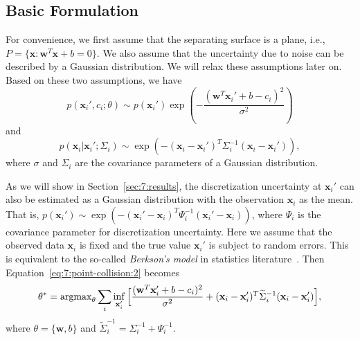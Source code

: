 \subsection{Basic Formulation}
\label{sec:7:algorithm:1}
For convenience, we first assume that the separating surface is a plane, i.e., $P = \{\mathbf x: \mathbf w^T \mathbf x + b = 0\}$. We also assume that the uncertainty due to noise can be described by a Gaussian distribution. We will relax these assumptions later on.
Based on these two assumptions, we have
\begin{equation}
p(\mathbf x_i', c_i; \theta) \sim p(\mathbf x_i') \exp(-\frac{(\mathbf w^T \mathbf x_i' + b - c_i)^2}{\sigma^2}) 
\end{equation}
and
\begin{equation}
p(\mathbf x_i | \mathbf x_i'; \Sigma_i) \sim \exp(-(\mathbf x_i - \mathbf x_i')^T \Sigma_i^{-1} (\mathbf x_i - \mathbf x_i')),
\end{equation}
where $\sigma$ and $\Sigma_i$ are the covariance parameters of a Gaussian distribution.

As we will show in Section~\ref{sec:7:results}, the discretization uncertainty at $\mathbf x_i'$ can also be estimated as a Gaussian distribution with the observation $\mathbf x_i$ as the mean. That is, $p(\mathbf x_i') \sim \exp(-(\mathbf x_i' - \mathbf x_i)^T \Psi_i^{-1} (\mathbf x_i' - \mathbf x_i))$, where $\Psi_i$ is the covariance parameter for discretization uncertainty. Here we assume that the observed data $\mathbf x_i$ is fixed and the true value $\mathbf x_i'$ is subject to random errors. This is equivalent to the so-called \emph{Berkson's model} in statistics literature~\cite{Berkson:1950}.
Then Equation~\ref{eq:7:point-collision:2} becomes
\begin{equation}
\label{eq:7:point-collision:3}
\theta^* = \operatorname{argmax}_{\theta} \sum_i \inf_{\mathbf x_i'} \Big[\frac{(\mathbf w^T \mathbf x_i' + b - c_i)^2}{\sigma^2} + (\mathbf x_i - \mathbf x_i')^T \widetilde{\Sigma}_i^{-1} (\mathbf x_i - \mathbf x_i')\Big],
\end{equation}
where $\theta = \{\mathbf w, b\}$ and $\widetilde{\Sigma}_i^{-1} = \Sigma_i^{-1} + \Psi_i^{-1}$.

